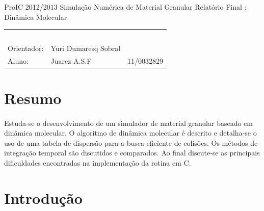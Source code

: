 \documentclass[a4paper,11pt]{article}
\begin{document}

\MakeMyTitlePage
{ProIC 2012/2013}
{Simulação Numérica de Material Granular}
{Relatório Final : Dinâmica Molecular}
{%
		\begin{tabular}{llr} \
		& & \\[0.05cm]		
		Orientador: & Yuri Dumaresq Sobral & \\
		
		Aluno:&
		 Juarez A.S.F 					& 11/0032829\\

		\end{tabular}
}

\section{Resumo}
\paragraph{}
Estuda-se o desenvolvimento de
um simulador de material granular baseado em dinâmica molecular.
O algoritmo de dinâmica molecular é descrito e detalha-se o
uso de uma tabela de dispersão para a busca eficiente  de
colisões. Os métodos de integração temporal são discutidos e
comparados. Ao final discute-se as principais dificuldades
encontradas na implementação da rotina em C.

\section{Introdução}
\end{document}
